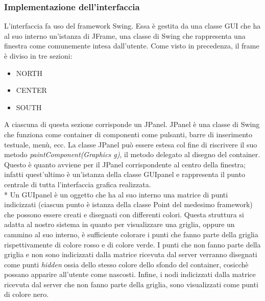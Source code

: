  \subsubsection{Implementazione dell'interfaccia}
 L'interfaccia fa uso del framework Swing. Essa \`e gestita da una classe GUI che ha al suo interno un'istanza di JFrame, una classe di Swing che rappresenta una finestra come comunemente intesa dall'utente. Come visto in precedenza, il frame \`e diviso in tre sezioni:
 \begin{itemize}
 	\item NORTH
 	\item CENTER
 	\item SOUTH
 \end{itemize}
A ciascuna di questa sezione corrisponde un JPanel. JPanel \`e una classe di Swing che funziona come container di componenti come pulsanti, barre di inserimento testuale, men\`u, ecc. La classe JPanel pu\`o essere estesa col fine di riscrivere il suo metodo \emph{paintComponent(Graphics g)}, il metodo delegato al disegno del container. Questo \`e quanto avviene per il JPanel corrispondente al centro della finestra; infatti quest'ultimo \`e un'istanza della classe GUIpanel e rappresenta il punto centrale di tutta l'interfaccia grafica realizzata.\\*
Un GUIpanel \`e un oggetto che ha al suo interno una matrice di punti indicizzati (ciascun punto \`e istanza della classe Point del medesimo framework) che possono essere creati e disegnati con differenti colori. Questa struttura si adatta al nostro sistema in quanto per visualizzare una griglia, oppure un cammino al suo interno, \`e sufficiente colorare i punti che fanno parte della griglia rispettivamente di colore rosso e di colore verde. I punti che non fanno parte della griglia e non sono indicizzati dalla matrice ricevuta dal server verranno disegnati come punti \emph{hidden} ossia dello stesso colore dello sfondo del container, cosicch\`e possano apparire all'utente come nascosti. Infine, i nodi indicizzati dalla matrice ricevuta dal server che non fanno parte della griglia, sono visualizzati come punti di colore nero.